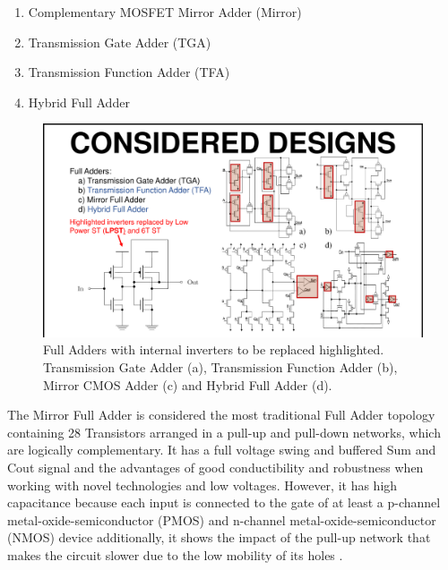\documentclass[diss,pgmicro,english]{iiufrgs}
\begin{document}
\begin{enumerate}
    \item Complementary MOSFET Mirror  Adder (Mirror)
    \item Transmission Gate Adder (TGA)
    \item Transmission Function Adder (TFA)
    \item Hybrid Full Adder
\end{enumerate}

\begin{figure}[ht]
\centering
\includegraphics[width=1\textwidth,trim={15.5cm 0cm 2cm 3cm},clip]{FAs.pdf}
\caption{Full Adders with internal inverters to be replaced highlighted. Transmission Gate Adder (a), Transmission Function Adder (b), Mirror CMOS Adder (c) and Hybrid Full Adder (d).}
\label{fig:FAs}
\end{figure}

The Mirror Full Adder is considered the most traditional Full Adder topology containing 28 Transistors arranged in a pull-up and pull-down networks, which are logically complementary. It has a full voltage swing and buffered Sum and Cout signal and the advantages of good conductibility and robustness when working with novel technologies and low voltages. However, it has high capacitance because each input is connected to the gate of at least a p-channel metal-oxide-semiconductor (PMOS) and n-channel metal-oxide-semiconductor (NMOS) device additionally, it shows the impact of the pull-up network that makes the circuit slower due to the low mobility of its holes \cite{beckett2002fine} \cite{devadas2017design} \cite{islam2011design}.
\end{document}
